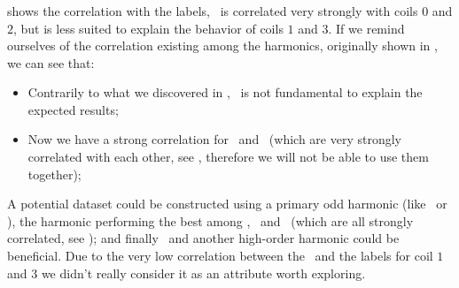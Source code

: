 \subsubsection{\an}
 shows the correlation with the labels, \an\ is correlated very strongly with
coils $0$ and $2$, but is less suited to explain the behavior of coils $1$ and $3$. If we remind
ourselves of the correlation existing among the harmonics, originally shown in , we can see that:
\begin{itemize}
	\item Contrarily to what we discovered in , \an[2]\ is not
	      fundamental to explain the expected results;
	\item Now we have a strong correlation for \an[1]\ and \an[3]\ (which are very
	      strongly correlated with each other, see , therefore we will not be able
	      to use them together);
\end{itemize}
A potential dataset could be constructed using a primary odd harmonic (like \an[1]\ or \an[3]), the
harmonic performing the best among \an[4], \an[8]\ and \an[12]\ (which are all strongly correlated, see
); and finally \an[2]\ and another high-order harmonic could be beneficial. Due to
the very low correlation between the \an\ and the labels for coil $1$ and $3$ we didn't really
consider it as an attribute worth exploring.
